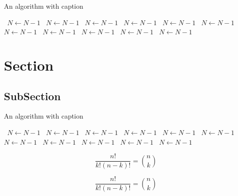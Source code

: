 \documentclass[a4paper]{article}
\begin{document}
\begin{algorithm}
\caption{An algorithm with caption}
\begin{algorithmic}
\    \State $N \gets N - 1$
\    \State $N \gets N - 1$
\    \State $N \gets N - 1$
\    \State $N \gets N - 1$
\    \State $N \gets N - 1$
\    \State $N \gets N - 1$
\    \State $N \gets N - 1$
\    \State $N \gets N - 1$
\    \State $N \gets N - 1$
\    \State $N \gets N - 1$
\    \State $N \gets N - 1$
\EndWhile
\end{algorithmic}
\end{algorithm}

\section{Section}

\subsection{SubSection}

\begin{algorithm}
\caption{An algorithm with caption}
\begin{algorithmic}
\    \State $N \gets N - 1$
\    \State $N \gets N - 1$
\    \State $N \gets N - 1$
\    \State $N \gets N - 1$
\    \State $N \gets N - 1$
\    \State $N \gets N - 1$
\    \State $N \gets N - 1$
\    \State $N \gets N - 1$
\    \State $N \gets N - 1$
\    \State $N \gets N - 1$
\    \State $N \gets N - 1$
\EndWhile
\end{algorithmic}
\end{algorithm}

\[ \frac{n!}{k!(n-k)!} = \binom{n}{k} \]

\[ \frac{n!}{k!(n-k)!} = \binom{n}{k} \]
\end{document}
